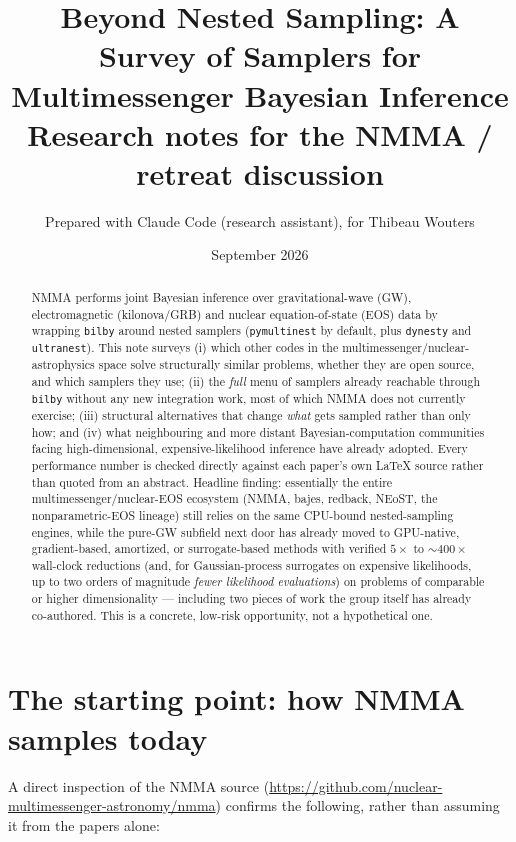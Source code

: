 \documentclass[11pt]{article}
\title{\vspace{-1.5cm}Beyond Nested Sampling: A Survey of Samplers for\\ Multimessenger Bayesian Inference\\[4pt]
\large Research notes for the NMMA / retreat discussion}
\author{Prepared with Claude Code (research assistant), for Thibeau Wouters}
\date{September 2026}
\newcommand{\code}[1]{\texttt{#1}}
\begin{document}
\maketitle

\begin{abstract}
\noindent
NMMA performs joint Bayesian inference over gravitational-wave (GW), electromagnetic
(kilonova/GRB) and nuclear equation-of-state (EOS) data by wrapping \code{bilby} around
nested samplers (\code{pymultinest} by default, plus \code{dynesty} and \code{ultranest}).
This note surveys (i) which other codes in the multimessenger/nuclear-astrophysics space
solve structurally similar problems, whether they are open source, and which samplers they
use; (ii) the \emph{full} menu of samplers already reachable through \code{bilby} without
any new integration work, most of which NMMA does not currently exercise; (iii) structural
alternatives that change \emph{what} gets sampled rather than only how; and (iv) what
neighbouring and more distant Bayesian-computation communities facing high-dimensional,
expensive-likelihood inference have already adopted. Every performance number is checked
directly against each paper's own \LaTeX{} source rather than quoted from an abstract.
Headline finding: essentially the entire multimessenger/nuclear-EOS ecosystem (NMMA, bajes,
redback, NEoST, the nonparametric-EOS lineage) still relies on the same CPU-bound
nested-sampling engines, while the pure-GW subfield next door has already moved to
GPU-native, gradient-based, amortized, or surrogate-based methods with verified $5\times$ to
$\sim\!400\times$ wall-clock reductions (and, for Gaussian-process surrogates on expensive
likelihoods, up to two orders of magnitude \emph{fewer likelihood evaluations}) on problems
of comparable or higher dimensionality --- including two pieces of work the group itself has
already co-authored. This is a concrete, low-risk opportunity, not a hypothetical one.
\end{abstract}

\section{The starting point: how NMMA samples today}

A direct inspection of the NMMA source
(\url{https://github.com/nuclear-multimessenger-astronomy/nmma}) confirms the following,
rather than assuming it from the papers alone:
\end{document}
